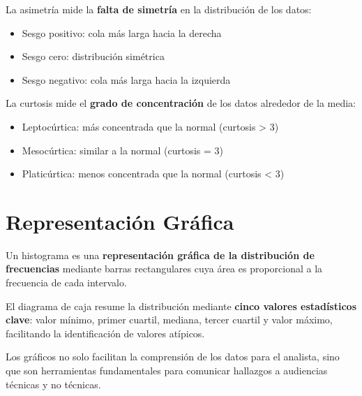 \begin{definition}
La asimetría mide la \textbf{falta de simetría} en la distribución de los datos:
\begin{itemize}
    \item Sesgo positivo: cola más larga hacia la derecha
    \item Sesgo cero: distribución simétrica
    \item Sesgo negativo: cola más larga hacia la izquierda
\end{itemize}
\end{definition}

\begin{definition}[Curtosis]
La curtosis mide el \textbf{grado de concentración} de los datos alrededor de la media:
\begin{itemize}
    \item Leptocúrtica: más concentrada que la normal (curtosis > 3)
    \item Mesocúrtica: similar a la normal (curtosis = 3)
    \item Platicúrtica: menos concentrada que la normal (curtosis < 3)
\end{itemize}
\end{definition}

\section{Representación Gráfica}

\begin{definition}[Histograma]
Un histograma es una \textbf{representación gráfica de la distribución de frecuencias} mediante barras rectangulares cuya área es proporcional a la frecuencia de cada intervalo.
\end{definition}

\begin{definition}
El diagrama de caja resume la distribución mediante \textbf{cinco valores estadísticos clave}: valor mínimo, primer cuartil, mediana, tercer cuartil y valor máximo, facilitando la identificación de valores atípicos.
\end{definition}

\begin{remark}
Los gráficos no solo facilitan la comprensión de los datos para el analista, sino que son herramientas fundamentales para comunicar hallazgos a audiencias técnicas y no técnicas.
\end{remark}

